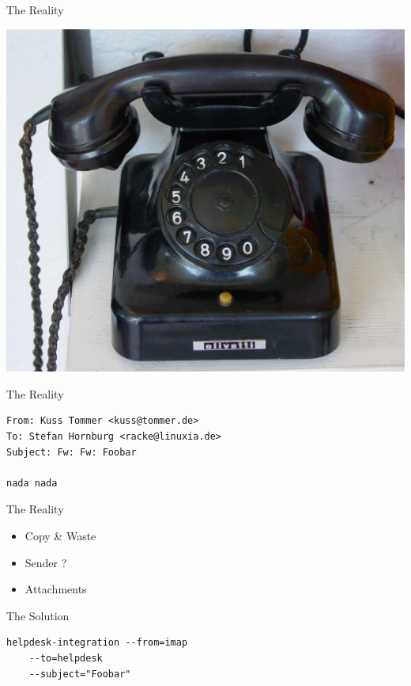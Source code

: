 \begin{frame}{The Reality}
\begin{center}
  \includegraphics[width=\textwidth,height=1\textheight,keepaspectratio]{pics/phone.jpg}
\end{center}
\end{frame}

\begin{frame}[fragile]{The Reality}
\begin{lstlisting}
From: Kuss Tommer <kuss@tommer.de>
To: Stefan Hornburg <racke@linuxia.de>
Subject: Fw: Fw: Foobar

nada nada
\end{lstlisting}
\end{frame}

\begin{frame}{The Reality}
\begin{itemize}
\item Copy \& Waste
\item Sender ?
\item Attachments
\end{itemize}
\end{frame}

\begin{frame}[fragile]{The Solution}
\begin{lstlisting}
helpdesk-integration --from=imap 
    --to=helpdesk 
    --subject="Foobar"
\end{lstlisting}
\end{frame}

